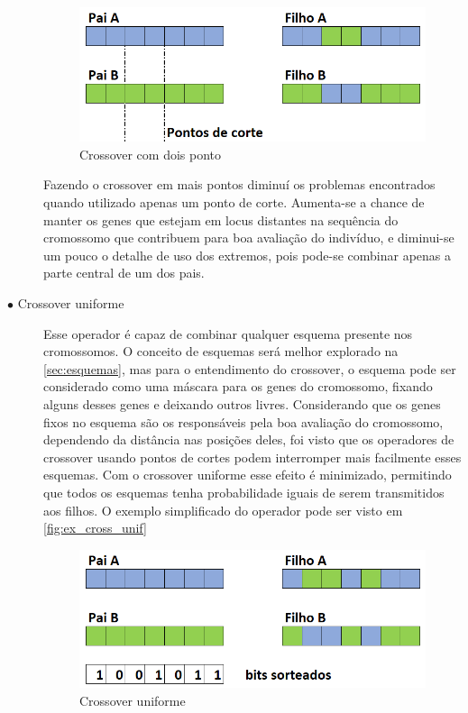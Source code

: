 \begin{description}
\begin{figure}[ht]
	\centering
	\includegraphics[width=0.75\linewidth]{imagens/exemplo_cross_2ptos.png}
	\caption{Crossover com dois ponto}
	\label{fig:ex_cross_2pto}
\end{figure}

Fazendo o crossover em  mais pontos diminuí os problemas encontrados quando utilizado apenas um ponto de corte. Aumenta-se a chance de manter os genes que estejam em locus distantes na sequência do cromossomo que contribuem para boa avaliação do indivíduo, e diminui-se um pouco o detalhe de uso dos extremos, pois pode-se combinar apenas a parte central de um dos pais.

\item[$\bullet$ Crossover uniforme] \text{}

Esse operador é capaz de combinar qualquer esquema presente nos cromossomos. O conceito de esquemas será melhor explorado na \autoref{sec:esquemas}, mas para o entendimento do crossover, o esquema pode ser considerado como uma máscara para os genes do cromossomo, fixando alguns desses genes e deixando outros livres. Considerando que os genes fixos no esquema são os responsáveis pela boa avaliação do cromossomo, dependendo da distância nas posições deles, foi visto que os operadores de crossover usando pontos de cortes podem interromper mais facilmente esses esquemas. Com o crossover uniforme esse efeito é minimizado, permitindo que todos os esquemas tenha probabilidade iguais de serem transmitidos aos filhos. O exemplo simplificado do operador pode ser visto em \autoref{fig:ex_cross_unif}
	
	\begin{figure}[ht]
		\centering
		\includegraphics[width=0.75\linewidth]{imagens/exemplo_cross_uniforme.png}
		\caption{Crossover uniforme}
		\label{fig:ex_cross_unif}
	\end{figure}


\end{description}
